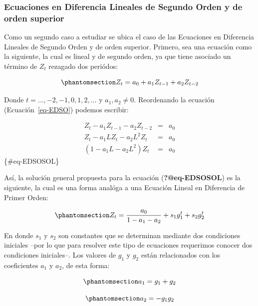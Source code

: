\documentclass[
  a4paper,
]{article}
\begin{document}
\subsubsection{Ecuaciones en Diferencia Lineales de Segundo Orden y de
orden
superior}\label{ecuaciones-en-diferencia-lineales-de-segundo-orden-y-de-orden-superior}

Como un segundo caso a estudiar se ubica el caso de las Ecuaciones en
Diferencia Lineales de Segundo Orden y de orden superior. Primero, sea
una ecuación como la siguiente, la cual es lineal y de segundo orden, ya
que tiene asociado un término de \(Z_t\) rezagado dos periódos:

\begin{equation}\phantomsection\label{eq-EDSO}{
    Z_t = a_0 + a_1 Z_{t-1} + a_2 Z_{t-2}
}\end{equation}

Donde \(t = \ldots, -2, -1, 0, 1, 2, \ldots\) y \(a_1, a_2 \neq 0\).
Reordenando la ecuación (Ecuación~\ref{eq-EDSO}) podemos escribir:

\begin{eqnarray}
    Z_t - a_1 Z_{t-1} - a_2 Z_{t-2} & = & a_0 \nonumber \\
    Z_t - a_1 L Z_{t} - a_2 L^2 Z_{t} & = & a_0 \nonumber \\
    (1 - a_1 L - a_2 L^2)Z_t & = & a_0 
\end{eqnarray} \{\#eq-EDSOSOL\}

Así, la solución general propuesta para la ecuación
(\textbf{?@eq-EDSOSOL}) es la siguiente, la cual es una forma analóga a
una Ecuación Lineal en Diferencia de Primer Orden:

\begin{equation}\phantomsection\label{eq-SOLGEN2}{
    Z_t = \frac{a_0}{1 - a_1 - a_2} + s_1 g^t_1 + s_2 g^t_2
}\end{equation}

En donde \(s_1\) y \(s_2\) son constantes que se determinan mediante dos
condiciones iniciales --por lo que para resolver este tipo de ecuaciones
requerimos conocer dos condiciones iniciales--. Los valores de \(g_1\) y
\(g_2\) están relacionados con los coeficientes \(a_1\) y \(a_2\), de
esta forma:

\begin{equation}\phantomsection\label{eq-a1}{
  a_1  =  g_1 + g_2
}\end{equation}

\begin{equation}\phantomsection\label{eq-a2}{
    a_2  =  - g_1 g_2
}\end{equation}
\end{document}
